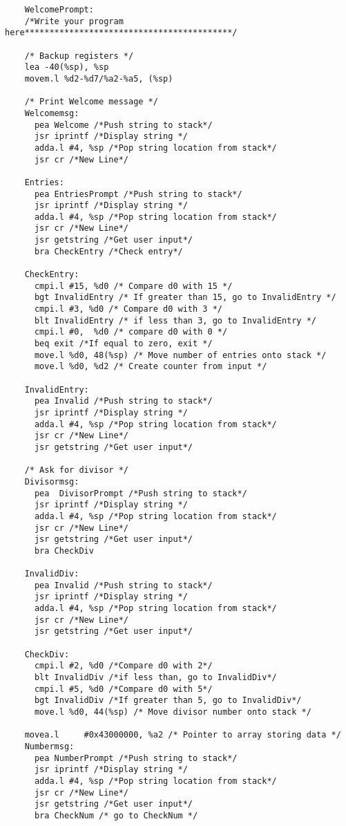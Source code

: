 \documentclass[10pt, letterpaper, titlepage]{article} %
\begin{document}
\begin{lstlisting}
	WelcomePrompt:
	/*Write your program here******************************************/
	
	/* Backup registers */
	lea -40(%sp), %sp
	movem.l %d2-%d7/%a2-%a5, (%sp)
	
	/* Print Welcome message */
	Welcomemsg:
	  pea Welcome /*Push string to stack*/
	  jsr iprintf /*Display string */
	  adda.l #4, %sp /*Pop string location from stack*/
	  jsr cr /*New Line*/
	
	Entries:
	  pea EntriesPrompt /*Push string to stack*/
	  jsr iprintf /*Display string */
	  adda.l #4, %sp /*Pop string location from stack*/
	  jsr cr /*New Line*/
	  jsr getstring /*Get user input*/
	  bra CheckEntry /*Check entry*/
	
	CheckEntry:
	  cmpi.l #15, %d0 /* Compare d0 with 15 */
	  bgt InvalidEntry /* If greater than 15, go to InvalidEntry */
	  cmpi.l #3, %d0 /* Compare d0 with 3 */
	  blt InvalidEntry /* if less than 3, go to InvalidEntry */
	  cmpi.l #0,  %d0 /* compare d0 with 0 */
	  beq exit /*If equal to zero, exit */
	  move.l %d0, 48(%sp) /* Move number of entries onto stack */
	  move.l %d0, %d2 /* Create counter from input */
	
	InvalidEntry:
	  pea Invalid /*Push string to stack*/
	  jsr iprintf /*Display string */
	  adda.l #4, %sp /*Pop string location from stack*/
	  jsr cr /*New Line*/
	  jsr getstring /*Get user input*/
	
	/* Ask for divisor */
	Divisormsg:
	  pea  DivisorPrompt /*Push string to stack*/
	  jsr iprintf /*Display string */
	  adda.l #4, %sp /*Pop string location from stack*/
	  jsr cr /*New Line*/
	  jsr getstring /*Get user input*/
	  bra CheckDiv
	
	InvalidDiv:
	  pea Invalid /*Push string to stack*/
	  jsr iprintf /*Display string */
	  adda.l #4, %sp /*Pop string location from stack*/
	  jsr cr /*New Line*/
	  jsr getstring /*Get user input*/
	
	CheckDiv:
	  cmpi.l #2, %d0 /*Compare d0 with 2*/
	  blt InvalidDiv /*if less than, go to InvalidDiv*/
	  cmpi.l #5, %d0 /*Compare d0 with 5*/
	  bgt InvalidDiv /*If greater than 5, go to InvalidDiv*/
	  move.l %d0, 44(%sp) /* Move divisor number onto stack */
	
	movea.l     #0x43000000, %a2 /* Pointer to array storing data */
	Numbermsg:
	  pea NumberPrompt /*Push string to stack*/
	  jsr iprintf /*Display string */
	  adda.l #4, %sp /*Pop string location from stack*/
	  jsr cr /*New Line*/
	  jsr getstring /*Get user input*/
	  bra CheckNum /* go to CheckNum */
	

\end{lstlisting}
\end{document}
